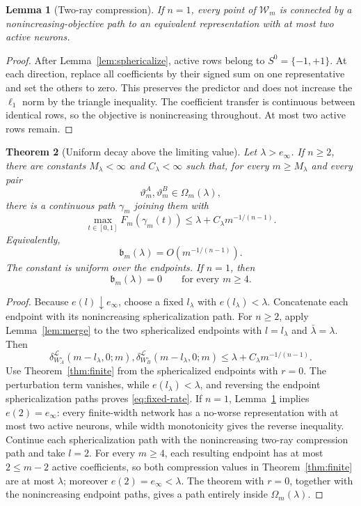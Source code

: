 \documentclass[pdflatex,sn-mathphys-num]{sn-jnl}
\theoremstyle{thmstyleone}
\newtheorem{theorem}{Theorem}[section]
\newtheorem{lemma}[theorem]{Lemma}
\theoremstyle{thmstyletwo}
\theoremstyle{thmstylethree}
\newcommand{\SubBar}{\mathfrak b}
\begin{document}
\begin{lemma}[Two-ray compression]\label{lem:two-ray}
If $n=1$, every point of $\mathcal W_m$ is connected by a nonincreasing-objective path to an equivalent representation with at most two active neurons.
\end{lemma}

\begin{proof}
After Lemma~\ref{lem:sphericalize}, active rows belong to $S^0=\{-1,+1\}$. At each direction, replace all coefficients by their signed sum on one representative and set the others to zero. This preserves the predictor and does not increase the $\ell_1$ norm by the triangle inequality. The coefficient transfer is continuous between identical rows, so the objective is nonincreasing throughout. At most two active rows remain.
\end{proof}

\begin{theorem}[Uniform decay above the limiting value]\label{thm:fixed-level}
Let $\lambda>e_\infty$. If $n\ge2$, there are constants $M_\lambda<\infty$ and $C_\lambda<\infty$ such that, for every $m\ge M_\lambda$ and every pair
\[
\vartheta_m^A,\vartheta_m^B\in\Omega_m(\lambda),
\]
there is a continuous path $\gamma_m$ joining them with
\begin{equation}
\max_{t\in[0,1]}F_m(\gamma_m(t))
\le\lambda+C_\lambda m^{-1/(n-1)}.
\label{eq:fixed-rate}
\end{equation}
Equivalently,
\[
\SubBar_m(\lambda)=O(m^{-1/(n-1)}).
\]
The constant is uniform over the endpoints.
If $n=1$, then
\[
\SubBar_m(\lambda)=0
\qquad\text{for every }m\ge4.
\]
\end{theorem}

\begin{proof}
Because $e(l)\downarrow e_\infty$, choose a fixed $l_\lambda$ with $e(l_\lambda)<\lambda$. Concatenate each endpoint with its nonincreasing sphericalization path. For $n\ge2$, apply Lemma~\ref{lem:merge} to the two sphericalized endpoints with $l=l_\lambda$ and $\bar\lambda=\lambda$. Then
\[
\delta_{W_A^\circ}^{\mathcal L}(m-l_\lambda,0;m),
\delta_{W_B^\circ}^{\mathcal L}(m-l_\lambda,0;m)
\le\lambda+C_\lambda m^{-1/(n-1)}.
\]
Use Theorem~\ref{thm:finite} from the sphericalized endpoints with $r=0$. The perturbation term vanishes, while $e(l_\lambda)<\lambda$, and reversing the endpoint sphericalization paths proves \eqref{eq:fixed-rate}. If $n=1$, Lemma~\ref{lem:two-ray} implies $e(2)=e_\infty$: every finite-width network has a no-worse representation with at most two active neurons, while width monotonicity gives the reverse inequality. Continue each sphericalization path with the nonincreasing two-ray compression path and take $l=2$. For every $m\ge4$, each resulting endpoint has at most $2\le m-2$ active coefficients, so both compression values in Theorem~\ref{thm:finite} are at most $\lambda$; moreover $e(2)=e_\infty<\lambda$. The theorem with $r=0$, together with the nonincreasing endpoint paths, gives a path entirely inside $\Omega_m(\lambda)$.
\end{proof}
\end{document}
